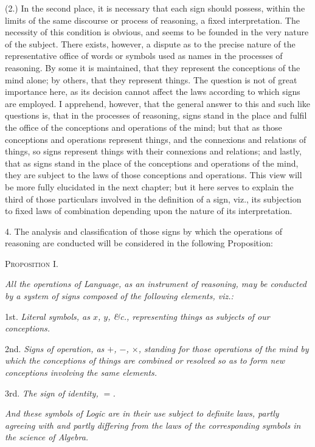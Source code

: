 \documentclass[oneside]{book}
\begin{document}
(2.) In the second place, it is necessary that each sign should
possess, within the limits of the same discourse or process of
reasoning, a fixed interpretation. The necessity of this condition
is obvious, and seems to be founded in the very nature of the
subject. There exists, however, a dispute as to the precise nature
of the representative office of words or symbols used as names in
the processes of reasoning. By some it is maintained, that they
represent the conceptions of the mind alone; by others, that they
represent things. The question is not of great importance here,
as its decision cannot affect the laws according to which signs
are employed. I apprehend, however, that the general answer
to this and such like questions is, that in the processes of reasoning,
signs stand in the place and fulfil the office of the conceptions
and operations of the mind; but that as those conceptions
and operations represent things, and the connexions and relations
of things, so signs represent things with their connexions and relations;
and lastly, that as signs stand in the place of the conceptions
and operations of the mind, they are subject to the laws
of those conceptions and operations. This view will be more
fully elucidated in the next chapter; but it here serves to explain
the third of those particulars involved in the definition of a sign,
viz., its subjection to fixed laws of combination depending upon
the nature of its interpretation.

4. The analysis and classification of those signs by which the
operations of reasoning are conducted will be considered in the
following Proposition:

\begin{center}
\textsc{Proposition I.}
\end{center}

\textit{All the operations of Language, as an instrument of reasoning,
may be conducted by a system of signs composed of the following elements,
viz.:}

1st. \textit{Literal symbols, as $x$, $y$, \&c., representing things as subjects
of our conceptions.}

2nd. \textit{Signs of operation, as $+$, $-$, $\times$, standing for those operations
of the mind by which the conceptions of things are combined or resolved
so as to form new conceptions involving the same elements.}

3rd. \textit{The sign of identity, $=$.}

\textit{And these symbols of Logic are in their use subject to definite
laws, partly agreeing with and partly differing from the laws of the
corresponding symbols in the science of Algebra.}
\end{document}
